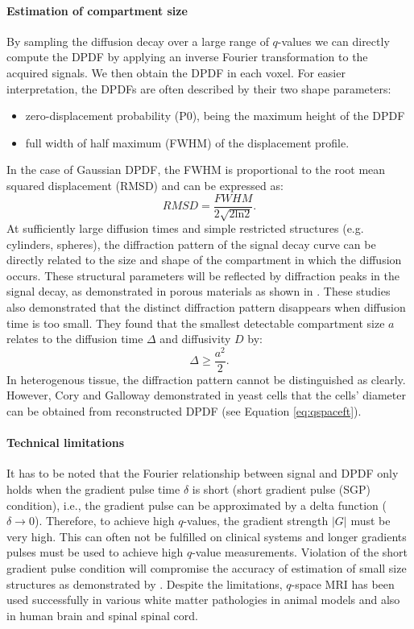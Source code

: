 \paragraph*{Estimation of compartment size}
By sampling the diffusion decay over a large range of $q$-values we can directly compute the DPDF by applying an inverse Fourier transformation to the acquired signals. We then obtain the DPDF in each voxel. For easier interpretation, the DPDFs are often described by their two shape parameters:
\begin{itemize}
	\item zero-displacement probability (P0), being the maximum height of the DPDF
	\item full width of half maximum (FWHM) of the displacement profile.
\end{itemize}
In the case of Gaussian DPDF, the FWHM is proportional to the root mean squared displacement (RMSD)\cite{cory90} and can be expressed as:
\begin{equation}
	RMSD = \frac{FWHM}{2\sqrt{2\mbox{ln}2}}.
\end{equation}
At sufficiently large diffusion times and simple restricted structures (e.g. cylinders, spheres), the diffraction pattern of the signal decay curve can be directly related to the size and shape of the compartment in which the diffusion occurs. These structural parameters will be reflected by diffraction peaks in the signal decay, as demonstrated in porous materials as shown in \cite{TODO}. These studies also demonstrated that the distinct diffraction pattern disappears when diffusion time is too small. They found that the smallest detectable compartment size $a$ relates to the diffusion time $\Delta$ and diffusivity $D$ by:
\begin{equation}
	\Delta \ge \frac{a^2}{2}.
\end{equation}   
In heterogenous tissue, the diffraction pattern cannot be distinguished as clearly. However, Cory and Galloway demonstrated in yeast cells that the cells’ diameter can be obtained from reconstructed DPDF (see Equation \ref{eq:qspaceft}).
\paragraph*{Technical limitations}
It has to be noted that the Fourier relationship between signal and DPDF only holds when the gradient pulse time $\delta$ is short (short gradient pulse (SGP) condition), i.e., the gradient pulse can be approximated by a delta function ($\delta\rightarrow 0$). Therefore, to achieve high $q$-values, the gradient strength $|G|$ must be very high. This can often not be fulfilled on clinical systems and longer gradients pulses must be used to achieve high $q$-value measurements. Violation of the short gradient pulse condition will compromise the accuracy of estimation of small size structures as demonstrated by \cite{laett07,TODO}. Despite the limitations, $q$-space MRI has been used successfully in various white matter pathologies in animal models \cite{TODO} and also in human brain \cite{TODO} and spinal spinal cord\cite{TODO}.  


